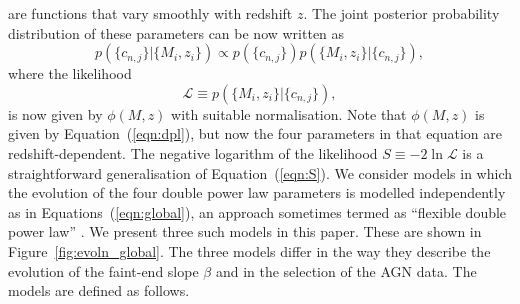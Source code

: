 \documentclass[fleqn,usenatbib]{mnras}
\begin{document}
are functions that vary smoothly with redshift $z$.  The joint
posterior probability distribution of these parameters can be now
written as
\begin{equation}
  p(\{c_{n,j}\} | \{M_i, z_i\}) \propto p(\{c_{n,j}\})p(\{M_i, z_i\} | \{c_{n,j}\}),
\end{equation}
where the likelihood 
\begin{equation}
  \mathcal{L}\equiv p(\{M_i, z_i\} | \{c_{n,j}\}),
\end{equation}
is now given by $\phi(M,z)$ with suitable normalisation.  Note that
$\phi(M,z)$ is given by Equation~(\ref{eqn:dpl}), but now the four
parameters in that equation are redshift-dependent.  The negative
logarithm of the likelihood $S\equiv -2\ln\mathcal{L}$ is a
straightforward generalisation of Equation~(\ref{eqn:S}).  We consider
models in which the evolution of the four double power law parameters
is modelled independently as in Equations~(\ref{eqn:global}), an
approach sometimes termed as ``flexible double power law''
\citep{2015MNRAS.451.1892A}.  We present three such models in this
paper.  These are shown in Figure~\ref{fig:evoln_global}.  The three
models differ in the way they describe the evolution of the faint-end
slope $\beta$ and in the selection of the AGN data.  The models are
defined as follows.
\end{document}
